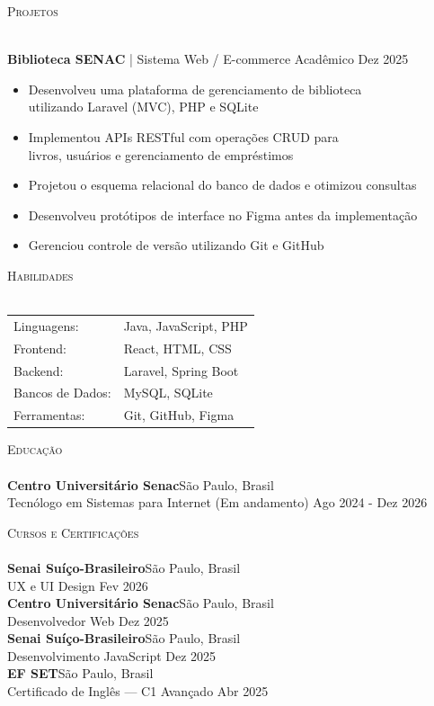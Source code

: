 \documentclass[a4paper]{article}
\newcommand{\lineunder}{
    \vspace*{-8pt} \\
    \hspace*{-18pt} \hrulefill \\
}
\newcommand{\header}[1]{
    {\hspace*{-18pt}\vspace*{6pt} \textsc{#1}}
    \vspace*{-6pt} \lineunder
}
\begin{document}
    \header{Projetos}
    \vspace{2mm}

    \textbf{Biblioteca SENAC} | Sistema Web / E-commerce Acadêmico \hfill Dez 2025\\
    \vspace{-2mm}
    \begin{itemize} \itemsep -3pt
    \item Desenvolveu uma plataforma de gerenciamento de biblioteca \\
    utilizando Laravel (MVC), PHP e SQLite
    \item Implementou APIs RESTful com operações CRUD para\\
    livros, usuários e gerenciamento de empréstimos
    \item Projetou o esquema relacional do banco de dados e otimizou consultas
    \item Desenvolveu protótipos de interface no Figma antes da implementação
    \item Gerenciou controle de versão utilizando Git e GitHub
    \end{itemize}

    \header{Habilidades}
    \vspace{2mm}
    \begin{longtable}{p{4cm}p{12cm}}
    Linguagens: & Java, JavaScript, PHP \\
    Frontend: & React, HTML, CSS \\
    Backend: & Laravel, Spring Boot \\
    Bancos de Dados: & MySQL, SQLite\\
    Ferramentas: & Git, GitHub, Figma
    \end{longtable}

    \header{Educação}
    \vspace{2mm}
    \textbf{Centro Universitário Senac}\hfill São Paulo, Brasil\\
    Tecnólogo em Sistemas para Internet (Em andamento) \hfill Ago 2024 - Dez 2026\\
    \vspace{3mm}

    \header{Cursos e Certificações}
    \vspace{2mm}
    \textbf{Senai Suíço-Brasileiro}\hfill São Paulo, Brasil\\
    UX e UI Design \hfill Fev 2026\\
    \vspace{1mm}
    \textbf{Centro Universitário Senac}\hfill São Paulo, Brasil\\
    Desenvolvedor Web \hfill Dez 2025\\
    \vspace{1mm}
    \textbf{Senai Suíço-Brasileiro}\hfill São Paulo, Brasil\\
    Desenvolvimento JavaScript \hfill Dez 2025\\
    \vspace{1mm}
    \textbf{EF SET}\hfill São Paulo, Brasil\\
    Certificado de Inglês — C1 Avançado \hfill Abr 2025\\
\end{document}
